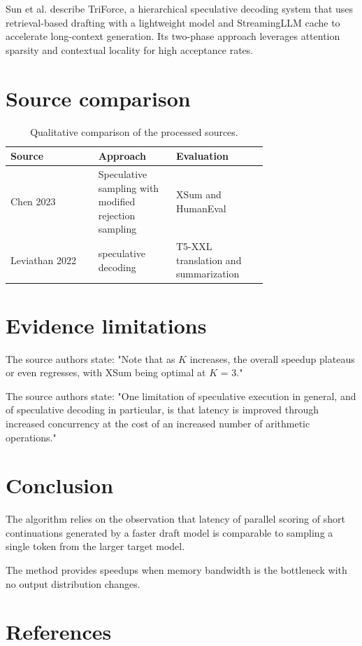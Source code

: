 \documentclass{article}\usepackage{amsmath,amssymb,graphicx,url}
\begin{document}
Sun et al. describe TriForce, a hierarchical speculative decoding system that uses retrieval-based drafting with a lightweight model and StreamingLLM cache to accelerate long-context generation. Its two-phase approach leverages attention sparsity and contextual locality for high acceptance rates. \cite{sun2024triforce}

\section{Source comparison}
\begin{table}[H]\centering
\caption{Qualitative comparison of the processed sources.}
\begin{tabular}{|>{\raggedright\arraybackslash}p{0.26\linewidth}|>{\raggedright\arraybackslash}p{0.235\linewidth}|>{\raggedright\arraybackslash}p{0.235\linewidth}|}\hline
Source & Approach & Evaluation \\ \hline
Chen 2023 \cite{chen2023accelerating} & Speculative sampling with modified rejection sampling & XSum and HumanEval \\ \hline
Leviathan 2022 \cite{leviathan2022fast} & speculative decoding & T5-XXL translation and summarization \\ \hline
\end{tabular}\end{table}
\section{Evidence limitations}
The source authors state: "Note that as \ensuremath{\mathit{K}}
increases, the overall speedup plateaus or even regresses, with XSum being optimal at \ensuremath{\mathit{K}} = 3." \cite{chen2023accelerating}

The source authors state: "One limitation of speculative execution in general, and of
speculative decoding in particular, is that latency is improved through increased concurrency at the cost of an increased number of arithmetic operations." \cite{leviathan2022fast}

\section{Conclusion}
The algorithm relies on the observation that latency of parallel scoring of short continuations generated by a faster draft model is comparable to sampling a single token from the larger target model. \cite{chen2023accelerating}

The method provides speedups when memory bandwidth is the bottleneck with no output distribution changes. \cite{leviathan2022fast}




\section*{References}
\end{document}
